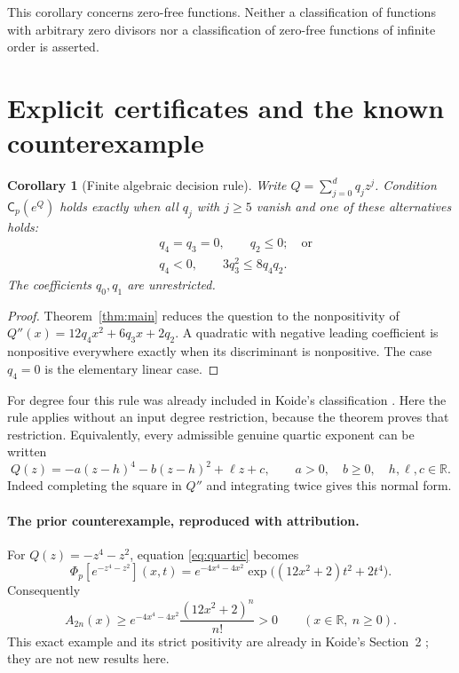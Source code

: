 \documentclass[11pt,a4paper]{article}
\newtheorem{corollary}[theorem]{Corollary}
\theoremstyle{remark}\newtheorem{remark}[theorem]{Remark}
\newcommand{\R}{\mathbb R}\newcommand{\C}{\mathbb C}
\newcommand{\Ph}{\Phi_p}
\begin{document}
This corollary concerns zero-free functions. Neither a classification
of functions with arbitrary zero divisors nor a classification of
zero-free functions of infinite order is asserted.

\section{Explicit certificates and the known counterexample}

\begin{corollary}[Finite algebraic decision rule]\label{cor:rule}
Write $Q=\sum_{j=0}^d q_jz^j$. Condition $\mathsf C_p(e^Q)$ holds
exactly when all $q_j$ with $j\ge5$ vanish and one of these alternatives
holds:
\begin{align*}
 &q_4=q_3=0,\qquad q_2\le0;\quad\text{or}\\
 &q_4<0,\qquad 3q_3^2\le8q_4q_2.
\end{align*}
The coefficients $q_0,q_1$ are unrestricted.
\end{corollary}
\begin{proof}
Theorem~\ref{thm:main} reduces the question to the nonpositivity of
$Q''(x)=12q_4x^2+6q_3x+2q_2$. A quadratic with negative leading
coefficient is nonpositive everywhere exactly when its discriminant
is nonpositive. The case $q_4=0$ is the elementary linear case.
\end{proof}

For degree four this rule was already included in Koide's
classification \cite{Koide}. Here the rule applies without an input
degree restriction, because the theorem proves that restriction.
Equivalently, every admissible genuine quartic exponent can be written
\[
 Q(z)=-a(z-h)^4-b(z-h)^2+\ell z+c,
 \qquad a>0,\quad b\ge0,\quad h,\ell,c\in\R.
\]
Indeed completing the square in $Q''$ and integrating twice gives this
normal form.

\paragraph{The prior counterexample, reproduced with attribution.}
For $Q(z)=-z^4-z^2$, equation \eqref{eq:quartic} becomes
\begin{equation}\label{eq:known}
 \Ph[e^{-z^4-z^2}](x,t)
 =e^{-4x^4-4x^2}\exp\bigl((12x^2+2)t^2+2t^4\bigr).
\end{equation}
Consequently
\begin{equation}\label{eq:strict}
 A_{2n}(x)\ge e^{-4x^4-4x^2}\frac{(12x^2+2)^n}{n!}>0
 \qquad(x\in\R,\ n\ge0).
\end{equation}
This exact example and its strict positivity are already in Koide's
Section~2 \cite{Koide}; they are not new results here.
\end{document}
